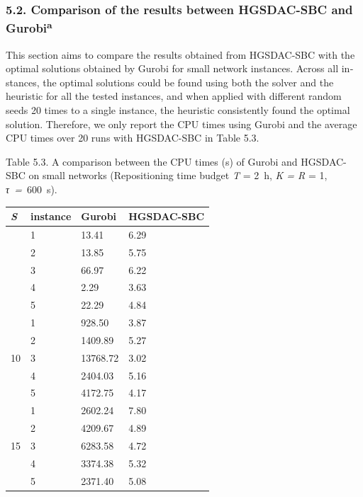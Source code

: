 \documentclass[
  english,
]{article}
\newcounter{none} %
\begin{document}
\begin{otherlanguage}{english}
\protect{}\label{s0115}
\subsubsection{\texorpdfstring{5.2. Comparison of the results between HGSDAC-SBC and
Gurobi\textsuperscript{a}}{5.2. Comparison of the results between HGSDAC-SBC and Gurobia}}\label{st135}

\protect{}\label{p0640}
This section aims to compare the results obtained from HGSDAC-SBC with the optimal solutions
obtained by Gurobi for small network instances. Across all instances, the optimal solutions could be
found using both the solver and the heuristic for all the tested instances, and when applied with
different random seeds 20 times to a single instance, the heuristic consistently found the optimal
solution. Therefore, we only report the CPU times using Gurobi and the average CPU times over 20
runs with HGSDAC-SBC in Table 5.3.

\protect{}\label{t0020}
Table 5.3. A comparison between the CPU times (s) of Gurobi and HGSDAC-SBC on small networks
(Repositioning time budget \emph{T} = 2~h, \emph{\textbar K\textbar{} = \textbar R}\textbar{} = 1,
\emph{τ~=}~600~s).

{\def\LTcaptype{none} %
\begin{longtable}[]{@{}llll@{}}
\toprule\noalign{}
\textbar{}\emph{S}\textbar{} & instance & Gurobi & HGSDAC-SBC \\
\midrule\noalign{}
\endhead
\bottomrule\noalign{}
\endlastfoot
\multirow{5}{*}{6} & 1 & 13.41 & 6.29 \\
& 2 & 13.85 & 5.75 \\
& 3 & 66.97 & 6.22 \\
& 4 & 2.29 & 3.63 \\
& 5 & 22.29 & 4.84 \\
\multirow{5}{*}{10} & 1 & 928.50 & 3.87 \\
& 2 & 1409.89 & 5.27 \\
& 3 & 13768.72 & 3.02 \\
& 4 & 2404.03 & 5.16 \\
& 5 & 4172.75 & 4.17 \\
\multirow{5}{*}{15} & 1 & 2602.24 & 7.80 \\
& 2 & 4209.67 & 4.89 \\
& 3 & 6283.58 & 4.72 \\
& 4 & 3374.38 & 5.32 \\
& 5 & 2371.40 & 5.08 \\
\end{longtable}
}


\end{otherlanguage}
\end{document}
